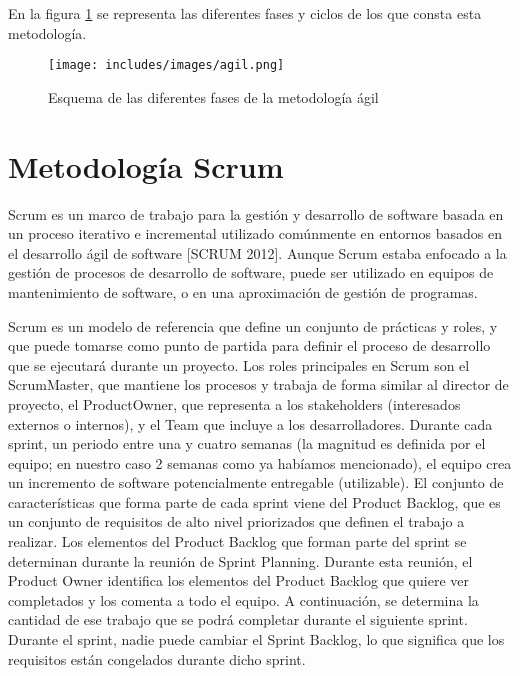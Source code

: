 En la figura \ref{fig:agil} se representa las diferentes fases y ciclos de los que consta esta metodología.

\begin{figure}[t]
\begin{center}
\texttt{[image: includes/images/agil.png]}
\caption{Esquema de las diferentes fases de la metodología ágil}
\label{fig:agil}
\end{center}
\end{figure}



\section{Metodología Scrum}
\label{capitulo5:scrum}
Scrum es un marco de trabajo para la gestión y desarrollo de software basada en un proceso iterativo e incremental utilizado comúnmente en entornos basados en el desarrollo ágil de software [SCRUM 2012].
Aunque Scrum estaba enfocado a la gestión de procesos de desarrollo de software, puede ser utilizado en equipos de mantenimiento de software, o en una aproximación de gestión de programas.

Scrum es un modelo de referencia que define un conjunto de prácticas y roles, y que puede tomarse como punto de partida para definir el proceso de desarrollo que se ejecutará durante un proyecto. Los roles principales en Scrum son el ScrumMaster, que mantiene los procesos y trabaja de forma similar al director de proyecto, el ProductOwner, que representa a los stakeholders (interesados externos o internos), y el Team que incluye a los desarrolladores.
Durante cada sprint, un periodo entre una y cuatro semanas (la magnitud es definida por el equipo; en nuestro caso 2 semanas como ya habíamos mencionado), el equipo crea un incremento de software potencialmente entregable (utilizable). El conjunto de características que forma parte de cada sprint viene del Product Backlog, que es un conjunto de requisitos de alto nivel priorizados que definen el trabajo a realizar. Los elementos del Product Backlog que forman parte del sprint se determinan durante la reunión de Sprint Planning. Durante esta reunión, el Product Owner identifica los elementos del Product Backlog que quiere ver completados y los comenta a todo el equipo. A continuación, se determina la cantidad de ese trabajo que se podrá completar durante el siguiente sprint. Durante el sprint, nadie puede cambiar el Sprint Backlog, lo que significa que los requisitos están congelados durante dicho sprint.

